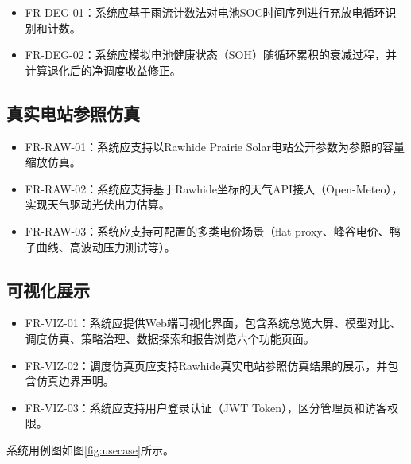 \documentclass[12pt,a4paper]{ctexbook}
\begin{document}
\begin{itemize}
  \item FR-DEG-01：系统应基于雨流计数法对电池SOC时间序列进行充放电循环识别和计数。\cite{rainflow-soc-2022}
  \item FR-DEG-02：系统应模拟电池健康状态（SOH）随循环累积的衰减过程，并计算退化后的净调度收益修正。\cite{battery-degradation-review-2021,rainflow-soc-2022}
\end{itemize}

\subsection{真实电站参照仿真}

\begin{itemize}
  \item FR-RAW-01：系统应支持以Rawhide Prairie Solar电站公开参数为参照的容量缩放仿真。\cite{rawhide-nrel}
  \item FR-RAW-02：系统应支持基于Rawhide坐标的天气API接入（Open-Meteo），实现天气驱动光伏出力估算。\cite{open-meteo-2023}
  \item FR-RAW-03：系统应支持可配置的多类电价场景（flat proxy、峰谷电价、鸭子曲线、高波动压力测试等）。\cite{duck-curve-caiso-2016,opsd-datapackage-2020,opsd-wiese-2019}
\end{itemize}

\subsection{可视化展示}

\begin{itemize}
  \item FR-VIZ-01：系统应提供Web端可视化界面，包含系统总览大屏、模型对比、调度仿真、策略治理、数据探索和报告浏览六个功能页面。
  \item FR-VIZ-02：调度仿真页应支持Rawhide真实电站参照仿真结果的展示，并包含仿真边界声明。
  \item FR-VIZ-03：系统应支持用户登录认证（JWT Token），区分管理员和访客权限。
\end{itemize}

系统用例图如图\ref{fig:usecase}所示。
\end{document}
